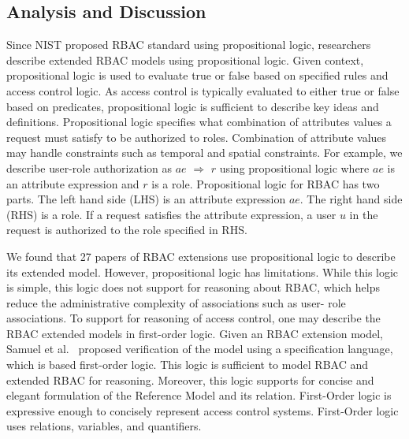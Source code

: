 \subsection{Analysis and Discussion}

Since NIST proposed RBAC standard using propositional logic, researchers describe extended RBAC models using propositional logic. Given context, propositional logic is used to evaluate true or false based on specified rules and access control logic. As access control is typically evaluated to either true or false based on predicates, propositional logic is sufficient to describe key ideas and definitions. Propositional logic specifies what combination of attributes values a request must satisfy to be authorized to roles. 
Combination of attribute values may handle constraints such as temporal and spatial constraints. For example, we describe user-role authorization as $ae$ $\Rightarrow$ $r$ using propositional logic where $ae$ is an attribute expression and $r$ is a role. Propositional logic for RBAC has two parts. The left hand side (LHS) is an attribute expression $ae$. The right hand side (RHS) is a role. If a request satisfies the attribute expression, a user $u$ in the request is authorized to the role specified in RHS.

We found that 27 papers of RBAC extensions use propositional logic to describe its extended model.
However, propositional logic has limitations. While this logic is simple, this logic does not support for reasoning about RBAC, which helps
reduce the administrative complexity of associations such as user- role associations.
To support for reasoning of access control, one may describe the RBAC extended models in first-order logic. 
Given an RBAC extension model, Samuel et al.~\cite{samuel07:spatio-temporal} proposed verification of the model using a specification language, which is based first-order logic. This logic is sufficient to model RBAC and extended RBAC for reasoning. Moreover, this logic supports for concise and elegant formulation of the Reference Model and its relation.  First-Order logic is expressive enough to concisely represent access control systems. First-Order logic uses relations, variables, and quantifiers.
